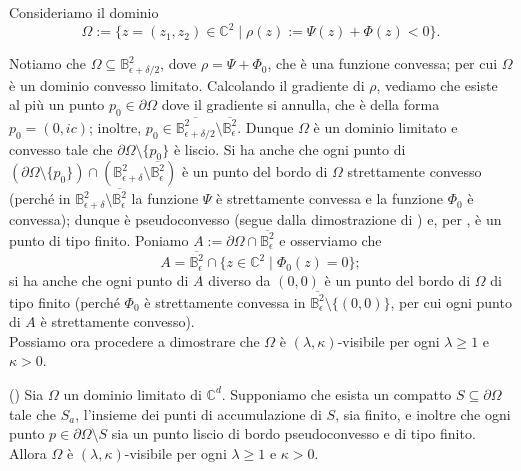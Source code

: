 Consideriamo il dominio
$$\Omega:=\{z=(z_1,z_2)\in\mathbb{C}^2\mid \rho(z):=\Psi(z)+\Phi(z)<0\}.$$

Notiamo che $\Omega\subseteq\mathbb{B}^2_{\epsilon+\delta/2}$, dove $\rho=\Psi+\Phi_0$, che è una funzione convessa; per cui $\Omega$ è un dominio convesso limitato. Calcolando il gradiente di $\rho$, vediamo che esiste al più un punto $p_0\in\partial\Omega$ dove il gradiente si annulla, che è della forma $p_0=(0,ic)$; inoltre, $p_0\in\overline{\mathbb{B}^2_{\epsilon+\delta/2}}\setminus\overline{\mathbb{B}^2_\epsilon}$. Dunque $\Omega$ è un dominio limitato e convesso tale che $\partial\Omega\setminus\{p_0\}$ è liscio. Si ha anche che ogni punto di $(\partial\Omega\setminus\{p_0\})\cap(\mathbb{B}^2_{\epsilon+\delta}\setminus\overline{\mathbb{B}^2_\epsilon})$ è un punto del bordo di $\Omega$ strettamente convesso (perché in $\mathbb{B}^2_{\epsilon+\delta}\setminus\overline{\mathbb{B}^2_\epsilon}$ la funzione $\Psi$ è strettamente convessa e la funzione $\Phi_0$ è convessa); dunque è pseudoconvesso (segue dalla dimostrazione di \cite[Proposition 2.1.13]{A2}) e, per \cite[Corollary 5.6]{D'A}, è un punto di tipo finito. Poniamo $A:=\partial\Omega\cap\overline{\mathbb{B}^2_\epsilon}$ e osserviamo che
$$A=\overline{\mathbb{B}^2_\epsilon}\cap\{z\in\mathbb{C}^2\mid \Phi_0(z)=0\};$$
si ha anche che ogni punto di $A$ diverso da $(0,0)$ è un punto del bordo di $\Omega$ di tipo finito (perché $\Phi_0$ è strettamente convessa in $\overline{\mathbb{B}^2_\epsilon}\setminus\{(0,0)\}$, per cui ogni punto di $A$ è strettamente convesso). \\

Possiamo ora procedere a dimostrare che $\Omega$ è $(\lambda,\kappa)$-visibile per ogni $\lambda \ge 1$ e $\kappa>0$.

\begin{prop} \label{safinisvis}
    (\cite[Corollary 1.10]{CMS}) Sia $\Omega$ un dominio limitato di $\mathbb{C}^d$. Supponiamo che esista un compatto $S\subseteq\partial\Omega$ tale che $S_a$, l'insieme dei punti di accumulazione di $S$, sia finito, e inoltre che ogni punto $p\in\partial\Omega\setminus S$ sia un punto liscio di bordo pseudoconvesso e di tipo finito. Allora $\Omega$ è $(\lambda,\kappa)$-visibile per ogni $\lambda \ge 1$ e $\kappa>0$.
\end{prop}

